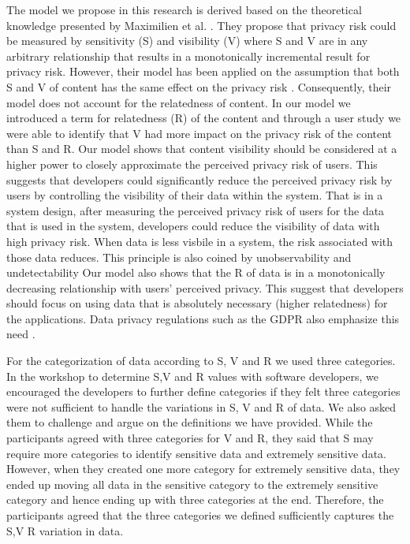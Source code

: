 \documentclass[10pt]{article}
\begin{document}
The model we propose in this research is derived based on the theoretical knowledge presented by Maximilien et al. \cite {maximilien2009privacy}. They propose that privacy risk could be measured by sensitivity (S) and visibility (V) where S and V are in any arbitrary relationship that results in a monotonically incremental result for privacy risk. However, their model has been applied on the assumption that both S and V of content has the same effect on the privacy risk \cite{minkus2014scale}. Consequently, their model does not account for the relatedness of content. In our model we introduced a term for relatedness (R) of the content and through a user study we were able to identify that V had more impact on the privacy risk of the content than S and R. Our model shows that content visibility should be considered at a higher power to closely approximate the perceived privacy risk of users. This suggests that developers could significantly reduce the perceived privacy risk by users by controlling the visibility of their data within the system. That is in a system design, after measuring the perceived privacy risk of users for the data that is used in the system, developers could reduce the visibility of data with high privacy risk. When data is less visbile in a system, the risk associated with those data reduces. This principle is also coined by unobservability and undetectability Our model also shows that the R of data is in a monotonically decreasing relationship with users' perceived privacy. This suggest that developers should focus on using data that is absolutely necessary (higher relatedness) for the applications. Data privacy regulations such as the GDPR also emphasize this need  \cite {wagner2016national}. 

For the categorization of data according to S, V and R we used three categories. In the workshop to determine S,V and R values with software developers, we encouraged the developers to further define categories if they felt three categories were not sufficient to handle the variations in S, V and R of data. We also asked them to challenge and argue on the definitions we have provided. While the participants agreed with three categories for V and R, they said that S may require more categories to identify sensitive data and extremely sensitive data. However, when they created one more category for extremely sensitive data, they ended up moving all data in the sensitive category to the extremely sensitive category and hence ending up with three categories at the end. Therefore, the participants agreed that the three categories we defined sufficiently captures the S,V R variation in data. 
\end{document}
